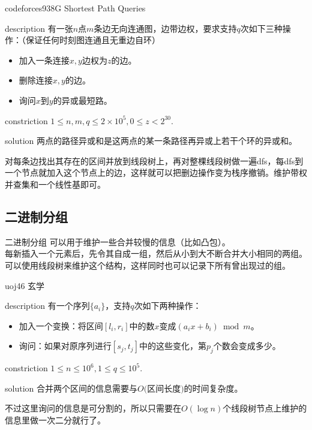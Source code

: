 \documentclass{beamer}
\begin{document}
	\begin{frame}{codeforces938G Shortest Path Queries}
		\begin{block}{description}
			有一张$n$点$m$条边无向连通图，边带边权，要求支持$q$次如下三种操作：（保证任何时刻图连通且无重边自环）
			
			\begin{itemize}
				\item 加入一条连接$x,y$边权为$z$的边。
				\item 删除连接$x,y$的边。
				\item 询问$x$到$y$的异或最短路。
			\end{itemize}
			
		\end{block}
		\begin{block}{constriction}
			$1 \le n, m, q \le 2\times 10^5, 0 \le z < 2^{30}.$
		\end{block}
		\pause
		\begin{block}{solution}
			两点的路径异或和是这两点的某一条路径再异或上若干个环的异或和。
			
			对每条边找出其存在的区间并放到线段树上，再对整棵线段树做一遍dfs，每dfs到一个节点就加入这个节点上的边，这样就可以把删边操作变为栈序撤销。维护带权并查集和一个线性基即可。
		\end{block}
	\end{frame}
	\subsection{二进制分组}
	\begin{frame}{二进制分组}
		可以用于维护一些合并较慢的信息（比如凸包）。\\
		
		每新插入一个元素后，先令其自成一组，然后从小到大不断合并大小相同的两组。\\
		
		可以使用线段树来维护这个结构，这样同时也可以记录下所有曾出现过的组。
	\end{frame}
	\begin{frame}{uoj46 玄学}
		\begin{block}{description}
			有一个序列$\{a_i\}$，支持$q$次如下两种操作：
			\begin{itemize}
				\item 加入一个变换：将区间$[l_i,r_i]$中的数$x$变成$(a_ix+b_i) \bmod m$。
			
				\item 询问：如果对原序列进行$[s_j,t_j]$中的这些变化，第$p_j$个数会变成多少。
			\end{itemize}
		\end{block}
		\begin{block}{constriction}
			$1 \le n \le 10^6, 1 \le q \le 10^5.$
		\end{block}
		\pause
		\begin{block}{solution}
			合并两个区间的信息需要与$O($区间长度$)$的时间复杂度。
			
			不过这里询问的信息是可分割的，所以只需要在$O(\log n)$个线段树节点上维护的信息里做一次二分就行了。
			
		\end{block}
	\end{frame}
\end{document}
